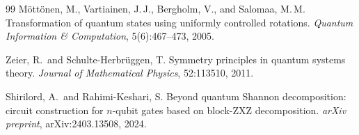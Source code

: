 \documentclass[12pt, a4paper, oneside]{report}
\theoremstyle{plain}
\theoremstyle{definition}
\theoremstyle{remark}
\begin{document}
\begin{thebibliography}{99}
M\"{o}tt\"{o}nen, M., Vartiainen, J.\,J., Bergholm, V., and Salomaa, M.\,M.
Transformation of quantum states using uniformly controlled rotations.
\textit{Quantum Information \& Computation}, 5(6):467--473, 2005.

Zeier, R.\ and Schulte-Herbr\"{u}ggen, T.
Symmetry principles in quantum systems theory.
\textit{Journal of Mathematical Physics}, 52:113510, 2011.

Shirilord, A.\ and Rahimi-Keshari, S.
Beyond quantum Shannon decomposition: circuit construction for $n$-qubit gates based on
block-ZXZ decomposition.
\textit{arXiv preprint}, arXiv:2403.13508, 2024.

\end{thebibliography}
\end{document}
